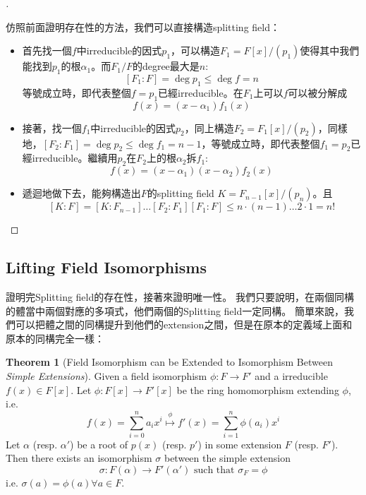\documentclass[12pt]{article}
\theoremstyle{definition}
\newtheorem{thm}{Theorem}
\newenvironment{proofs}[1][\proofname]{%
  \begin{proof}[#1]$ $\par\nobreak\ignorespaces
}{%
  \end{proof}
}
\begin{document}
\begin{proofs}
	仿照前面證明存在性的方法，我們可以直接構造splitting field：
	\begin{itemize}
		\item 首先找一個$f$中irreducible的因式$p_1$，可以構造$F_1=F[x]/(p_1)$使得其中我們能找到$p_1$的根$\alpha_1$。而$F_1/F$的degree最大是$n$:
		      \[ [F_1:F]=\deg p_1\le \deg f=n\]
		      等號成立時，即代表整個$f=p_1$已經irreducible。在$F_1$上可以$f$可以被分解成
		      \[f(x)=(x-\alpha_1)f_1(x)\]
		\item 接著，找一個$f_1$中irreducible的因式$p_2$，同上構造$F_2=F_1[x]/(p_2)$，同樣地，$[F_2:F_1]=\deg p_2 \le \deg f_1=n-1$，等號成立時，即代表整個$f_1=p_2$已經irreducible。繼續用$p_2$在$F_2$上的根$\alpha_2$拆$f_1$:
		      \[f(x)=(x-\alpha_1)(x-\alpha_2)f_2(x)\]
		\item 遞迴地做下去，能夠構造出$F$的splitting field $K=F_{n-1}[x]/(p_n)$。且
		      \[[K:F]= [K:F_{n-1}]\dots[F_2:F_1][F_1:F] \le n\cdot(n-1)\dots 2 \cdot 1 = n!\]
	\end{itemize}
\end{proofs}

\subsection{Lifting Field Isomorphisms}

證明完Splitting field的存在性，接著來證明唯一性。
我們只要說明，在兩個同構的體當中兩個對應的多項式，他們兩個的Splitting field一定同構。
簡單來說，我們可以把體之間的同構提升到他們的extension之間，但是在原本的定義域上面和原本的同構完全一樣：

\begin{thm}[Field Isomorphism can be Extended to Isomorphism Between \textit{Simple Extensions}]\label{lift_simple}
	Given a field isomorphism $\phi:F\to F'$ and a irreducible $f(x)\in F[x]$. Let ${\phi}:F[x]\to F'[x]$ be the ring homomorphism extending $\phi$, i.e.
	\[f(x)=\sum_{i=0}^n a_i x^i \overset{{\phi}}{\mapsto} f'(x)=\sum_{i=1}^n \phi(a_i) x^i\]
	Let $\alpha$ (resp. $\alpha'$) be a root of $p(x)$ (resp. $p'$) in some extension $F$ (resp. $F'$). Then there exists an isomorphism $\sigma$ between the simple extension
	\[\sigma:F(\alpha)\to F'(\alpha')\text{ such that } \sigma_F=\phi\]
	i.e. $\sigma(a)=\phi(a) \forall a \in F$.
\end{thm}
\end{document}
